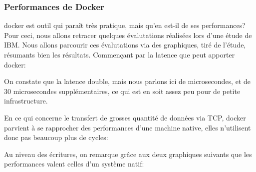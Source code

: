 \documentclass[
    iai, %
    il, %
]{heig-tb}
\begin{document}
\subsubsection{Performances de Docker}
\Gls{docker} est outil qui paraît très pratique, mais qu'en est-il de ses performances?
Pour ceci, nous allons retracer quelques évalutations réalisées lors d'une étude de IBM. Nous allons parcourir ces évalutations via des graphiques, tiré de l'étude, résumants bien les résultats.
Commençant par la latence que peut apporter \Gls{docker}: %

On constate que la latence double, mais nous parlons ici de microsecondes, et de 30 microsecondes supplémentaires, ce qui est en soit assez peu pour de petite infrastructure.

En ce qui concerne le transfert de grosses quantité de données via TCP, docker parvient à se rapprocher des performances d'une machine native, elles n'utilisent donc pas beaucoup plus de cycles: %

Au niveau des écritures, on remarque grâce aux deux graphiques suivants que les performances valent celles d'un système natif: %


\end{document}
